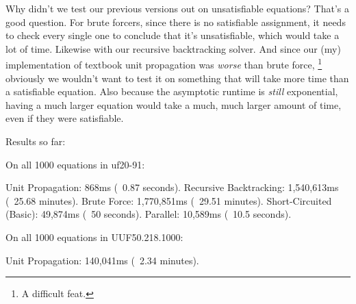 Why didn't we test our previous versions out on unsatisfiable equations? That's a good question.
For brute forcers, since there is no satisfiable assignment, it needs to check every single 
one to conclude that it's unsatisfiable, which would take a lot of time. Likewise with our 
recursive backtracking solver. And since our (my) implementation of textbook unit propagation 
was \textit{worse} than brute force,
\footnote{A difficult feat.}
obviously we wouldn't want to test it on something that will take more time than a satisfiable 
equation. Also because the asymptotic runtime is \textit{still} exponential, having a much 
larger equation would take a much, much larger amount of time, even if they were satisfiable.

\begin{FVerbatim}
Results so far:

On all 1000 equations in uf20-91:

Unit Propagation:          868ms (~0.87 seconds).
Recursive Backtracking:    1,540,613ms (~25.68 minutes).
Brute Force:               1,770,851ms (~29.51 minutes).
Short-Circuited (Basic):   49,874ms (~50 seconds).
Parallel:                  10,589ms (~10.5 seconds).

On all 1000 equations in UUF50.218.1000:

Unit Propagation: 140,041ms (~2.34 minutes).
\end{FVerbatim}